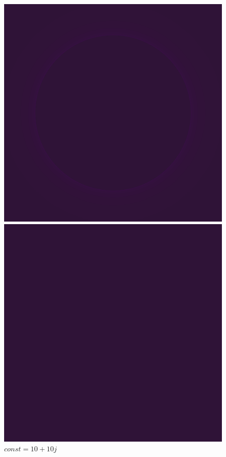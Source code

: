 \documentclass{article}
\begin{document}
\begin{figure}[H]
	\centering
	\begin{minipage}{0.45\textwidth}
		\centering
		\includegraphics[width=\linewidth]{Utils/article_dependencies/Implementation_chapter/render_6.png}
		\caption{\footnotesize $const = 0$}
		\label{fig:render6}
	\end{minipage}
	\hfill
	\begin{minipage}{0.45\textwidth}
		\centering
		\includegraphics[width=\linewidth]{Utils/article_dependencies/Implementation_chapter/render_7.png}
		\caption{\footnotesize $const = 10 + 10j$}
		\label{fig:render7}
	\end{minipage}
\end{figure}
\end{document}
